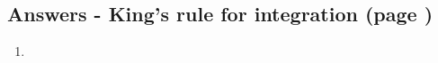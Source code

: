 \documentclass[../main.tex]{subfiles}
\begin{document}
\subsection*{Answers - King's rule for integration (page \pageref{Kings rule})}
\label{Kings rule answers}
\begin{enumerate}[itemsep=0.7cm]
    \item 
    

\end{enumerate}


\pagebreak
\end{document}
